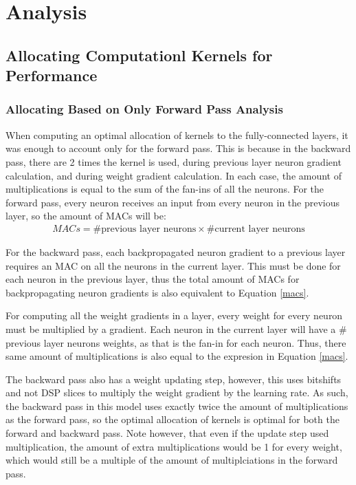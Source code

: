 \chapter{Analysis}\label{analysis}

\section{Allocating Computationl Kernels for Performance}
\subsection{Allocating Based on Only Forward Pass Analysis}
When computing an optimal allocation of kernels to the fully-connected layers, it was enough to account only for the forward pass. This is because in the backward pass, there are 2 times the kernel is used, during previous layer neuron gradient calculation, and during weight gradient calculation. In each case, the amount of multiplications is equal to the sum of the fan-ins of all the neurons. For the forward pass, every neuron receives an input from every neuron in the previous layer, so the amount of MACs will be:
\begin{align}
MACs = \text{\#previous layer neurons} \times \text{\#current layer neurons} \label{macs}
\end{align}

For the backward pass, each backpropagated neuron gradient to a previous layer requires an MAC on all the neurons in the current layer. This must be done for each neuron in the previous layer, thus the total amount of MACs for backpropagating neuron gradients is also equivalent to Equation \ref{macs}.

For computing all the weight gradients in a layer, every weight for every neuron must be multiplied by a gradient. Each neuron in the current layer will have a \# previous layer neurons weights, as that is the fan-in for each neuron. Thus, there same amount of multiplications is also equal to the expresion in Equation \ref{macs}.

The backward pass also has a weight updating step, however, this uses bitshifts and not DSP slices to multiply the weight gradient by the learning rate. As such, the backward pass in this model uses exactly twice the amount of multiplications as the forward pass, so the optimal allocation of kernels is optimal for both the forward and backward pass. Note however, that even if the update step used multiplication, the amount of extra multiplications would be 1 for every weight, which would still be a multiple of the amount of multiplciations in the forward pass.

